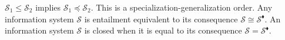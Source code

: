 \documentclass{amsart}
\theoremstyle{remark}
\theoremstyle{definition}
\begin{document}
$\mathcal{S}_{1} \leq \mathcal{S}_{2}$ implies $\mathcal{S}_{1} \preceq \mathcal{S}_{2}$.
This is a specialization-generalization order.
Any information system $\mathcal{S}$ is entailment equivalent to its consequence 
$\mathcal{S} \cong \mathcal{S}^{\scriptscriptstyle\blacklozenge}$.
An information system $\mathcal{S}$ is closed when it is equal to its consequence 
$\mathcal{S} = \mathcal{S}^{\scriptscriptstyle\blacklozenge}$.

%
\end{document}

